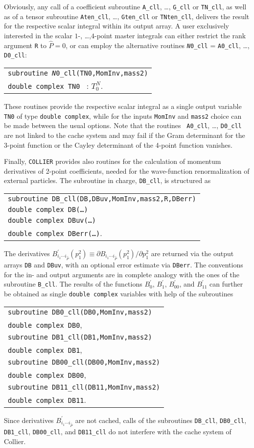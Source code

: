 \documentclass[preprint,sort&compress,12pt]{elsarticle}
\makeatletter
\def\bce{\begin{center}}
\def\ece{\end{center}}
\newcommand{\collier}{{\sc Collier}}
\newlength{\parwidth}\newlength{\colonewidth}%
\newcommand{\cpcsub}[1]
{%
\setlength{\parwidth}{\textwidth}\addtolength{\parwidth}{-2.1em}%
\bce
\begin{tabular}[t]{@{}p{\parwidth}@{}}
#1
\end{tabular}
\ece
}%
\makeatother
\begin{document}
Obviously, any call of a coefficient subroutine {\tt A\_cll}, \ldots, {\tt G\_cll} or {\tt TN\_cll}, as well as of a tensor subroutine
{\tt Aten\_cll}, \ldots, {\tt Gten\_cll} or {\tt TNten\_cll}, delivers 
the result for the respective scalar integral within its output array.
A user exclusively interested in the scalar $1$-, \ldots ,$4$-point master
integrals can either restrict the rank argument {\tt R} to
$\widehat{P}=0$, or can
employ the alternative routines {\tt {\it N}0\_cll} = {\tt A0\_cll}, \ldots, {\tt D0\_cll}:
\cpcsub{
{\tt subroutine  {\it N}0\_cll(TN0,MomInv,mass2)}\\
  {\tt double complex TN0 } : $T^N_0$\;.
}
These routines provide the respective scalar integral as a single output variable
{\tt TN0} of type {\tt double complex}, while for the inputs {\tt MomInv} and {\tt mass2} choice can be made
between the usual options. Note that the routines {\tt
  A0\_cll}, \ldots, {\tt D0\_cll} are not linked to the cache system 
and may fail if the Gram determinant for the 3-point function or the
Cayley determinant of the 4-point function vanishes.

Finally, {\tt COLLIER} provides also routines for the calculation of momentum
derivatives of 2-point coefficients, needed for the wave-function
renormalization of external particles. The subroutine in charge, {\tt DB\_cll}, is structured as
\cpcsub{
{\tt subroutine  DB\_cll(DB,DBuv,MomInv,mass2,R,DBerr)}\\
  {\tt double complex DB(\ldots)} \\
  {\tt double complex DBuv(\ldots)} \\
  {\tt double complex DBerr(\ldots)}\;. 
}
The derivatives $B^\prime_{i_1\cdots i_{\widehat{P}}}(p_1^2) \equiv \partial B_{i_1\cdots i_{\widehat{P}}}(p_1^2)/\partial p_1^2$ 
are returned via the output arrays {\tt DB} and {\tt DBuv}, with 
an optional error estimate via {\tt DBerr}. The conventions for the in- and output arguments are in complete
analogy with the ones of the subroutine {\tt B\_cll}. 
The results of the functions $B_0^\prime$, $B_1^\prime$, $B_{00}^\prime$, and $B_{11}^\prime$
can further be obtained as single {\tt double complex} variables with help of the subroutines
\cpcsub{
{\tt subroutine  DB0\_cll(DB0,MomInv,mass2)}\\
  {\tt double complex DB0}\;, \\
{\tt subroutine  DB1\_cll(DB1,MomInv,mass2)}\\
  {\tt double complex DB1}\;, \\
{\tt subroutine  DB00\_cll(DB00,MomInv,mass2)}\\
  {\tt double complex DB00}\;, \\
{\tt subroutine  DB11\_cll(DB11,MomInv,mass2)}\\
  {\tt double complex DB11}\;. \\
}
Since derivatives $B^\prime_{i_1\cdots i_{\widehat{P}}}$ are not cached, 
calls of the subroutines {\tt DB\_cll}, {\tt DB0\_cll},
{\tt DB1\_cll}, {\tt DB00\_cll}, and {\tt DB11\_cll} 
do not interfere with the cache system of {\collier}.
\end{document}
